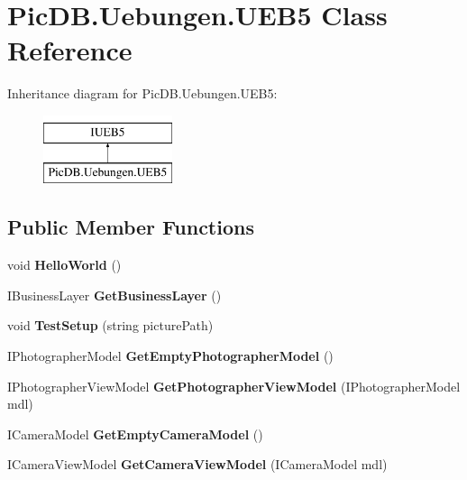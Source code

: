 \hypertarget{class_pic_d_b_1_1_uebungen_1_1_u_e_b5}{}\section{Pic\+D\+B.\+Uebungen.\+U\+E\+B5 Class Reference}
\label{class_pic_d_b_1_1_uebungen_1_1_u_e_b5}
Inheritance diagram for Pic\+D\+B.\+Uebungen.\+U\+E\+B5\+:\begin{figure}[H]
\begin{center}
\leavevmode
\includegraphics[height=2.000000cm]{class_pic_d_b_1_1_uebungen_1_1_u_e_b5}
\end{center}
\end{figure}
\subsection*{Public Member Functions}
\begin{DoxyCompactItemize}
\item 
\mbox{\label{class_pic_d_b_1_1_uebungen_1_1_u_e_b5_a2ac5dd4aaaea5b42aed2cdf9847d8c6c}} 
void {\bfseries Hello\+World} ()
\item 
\mbox{\label{class_pic_d_b_1_1_uebungen_1_1_u_e_b5_af88f6ca5fab1e4ac53b771e665a4a5cd}} 
I\+Business\+Layer {\bfseries Get\+Business\+Layer} ()
\item 
\mbox{\label{class_pic_d_b_1_1_uebungen_1_1_u_e_b5_ae4a6fcd24facd01502fc2747d953a19f}} 
void {\bfseries Test\+Setup} (string picture\+Path)
\item 
\mbox{\label{class_pic_d_b_1_1_uebungen_1_1_u_e_b5_ac95c56209a6dd319db8609f65fcd749a}} 
I\+Photographer\+Model {\bfseries Get\+Empty\+Photographer\+Model} ()
\item 
\mbox{\label{class_pic_d_b_1_1_uebungen_1_1_u_e_b5_a6846ca223fc7a1e6332da98d45118ed3}} 
I\+Photographer\+View\+Model {\bfseries Get\+Photographer\+View\+Model} (I\+Photographer\+Model mdl)
\item 
\mbox{\label{class_pic_d_b_1_1_uebungen_1_1_u_e_b5_a71a45c8e58726a7e07463f5d879636ab}} 
I\+Camera\+Model {\bfseries Get\+Empty\+Camera\+Model} ()
\item 
\mbox{\label{class_pic_d_b_1_1_uebungen_1_1_u_e_b5_a3a0ef538ae3ce2e9a8531a76103faa84}} 
I\+Camera\+View\+Model {\bfseries Get\+Camera\+View\+Model} (I\+Camera\+Model mdl)
\end{DoxyCompactItemize}


